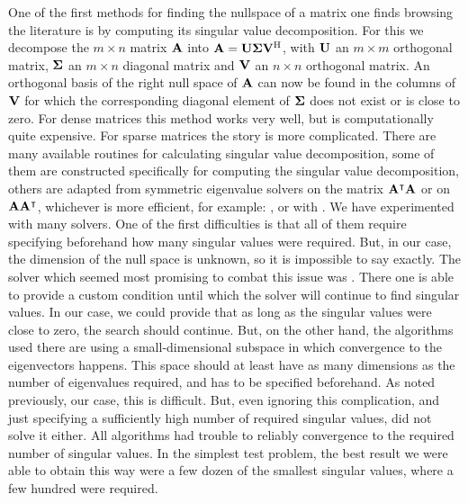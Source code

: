 One of the first methods for finding the nullspace of a matrix one finds browsing the literature \cite{golub_matrix_2013} is by computing its singular value decomposition. For this we decompose the $m \times n$ matrix $\vb{A}$ into $\vb{A} = \vb{U}\vb{\Sigma}{\vb{V}}^{\text{H}}$, with $\vb{U}$ an $m \times m$ orthogonal matrix, $\vb{\Sigma}$ an $m \times n$ diagonal matrix and $\vb{V}$ an $n \times n$ orthogonal matrix. An orthogonal basis of the right null space of $\vb{A}$ can now be found in the columns of $\vb{V}$ for which the corresponding diagonal element of $\vb{\Sigma}$ does not exist or is close to zero. For dense matrices this method works very well, but is computationally quite expensive. For sparse matrices the story is more complicated. There are many available routines for calculating singular value decomposition, some of them are constructed specifically for computing the singular value decomposition, others are adapted from symmetric eigenvalue solvers on the matrix ${\vb{A}}^\intercal\vb{A}$ or on $\vb{A}{\vb{A}}^\intercal$, whichever is more efficient, for example: \slepc \cite{hernandez_slepc_2005}, \spectra \cite{qiu_yixuan_2022} or \scipy \cite{virtanen_scipy_2020} with \arpack \cite{lehoucq_arpack_1998}. We have experimented with many solvers. One of the first difficulties is that all of them require specifying beforehand how many singular values were required. But, in our case, the dimension of the null space is unknown, so it is impossible to say exactly. The solver which seemed most promising to combat this issue was \slepc \cite{hernandez_slepc_2005}. There one is able to provide a custom condition until which the solver will continue to find singular values. In our case, we could provide that as long as the singular values were close to zero, the search should continue. But, on the other hand, the algorithms used there are using a small-dimensional subspace in which convergence to the eigenvectors happens. This space should at least have as many dimensions as the number of eigenvalues required, and has to be specified beforehand. As noted previously, our case, this is difficult. But, even ignoring this complication, and just specifying a sufficiently high number of required singular values, did not solve it either. All algorithms had trouble to reliably convergence to the required number of singular values. In the simplest test problem, the best result we were able to obtain this way were a few dozen of the smallest singular values, where a few hundred were required.

